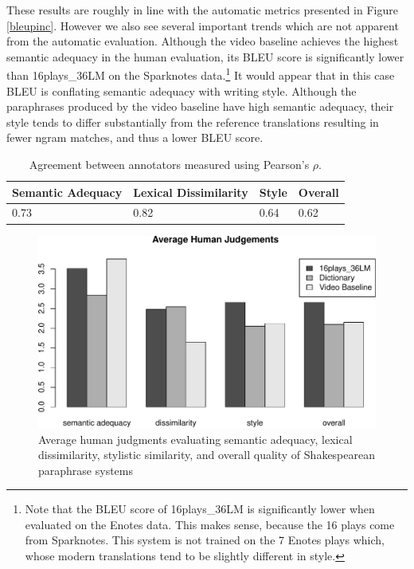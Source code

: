 \documentclass[10pt,a5paper,twoside]{article}
\begin{document}
These results are roughly in line with the automatic metrics presented in Figure \ref{bleupinc}.  However we also see several important
trends which are not apparent from the automatic evaluation.
Although the video baseline achieves the highest semantic adequacy in the human evaluation, its BLEU score
is significantly lower than 16plays\_36LM on the Sparknotes data.\footnote{
Note that the BLEU score of 16plays\_36LM is significantly lower when evaluated on the Enotes data.  This makes sense, because the 
16 plays come from Sparknotes. This system is not trained on the 7 Enotes plays which, whose modern translations tend
to be slightly different in style.}
It would appear that in this case BLEU is conflating semantic adequacy with writing style.  Although the paraphrases produced 
by the video baseline have high semantic adequacy, their style tends to differ substantially from the reference translations resulting
in fewer ngram matches, and thus a lower BLEU score.

\begin{table}
  \begin{center}
    \begin{tabular}{|l|l|l|l|}
      \hline
      Semantic Adequacy & Lexical Dissimilarity & Style & Overall \\
      \hline
      \hline
      0.73 & 0.82 & 0.64 & 0.62 \\
      \hline
    \end{tabular}
  \end{center}
  \caption{Agreement between annotators measured using Pearson's $\rho$.}
  \label{annotator_agreement}
\end{table}

\begin{figure}[ht]
  \begin{center}
    \includegraphics[width=5in]{figures/human_judgements-crop.pdf}
  \end{center}
  \caption{Average human judgments evaluating semantic adequacy, lexical dissimilarity, stylistic similarity, and overall quality
    of Shakespearean paraphrase systems} 
  \label{human_judgements}
\end{figure}
\end{document}
